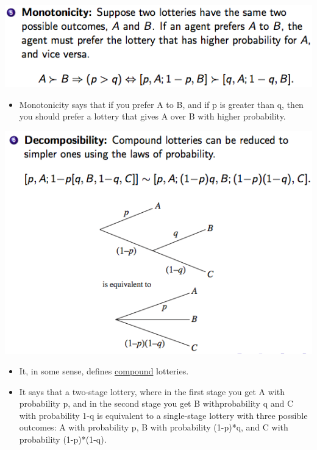 \documentclass[12pt]{article}
\begin{document}
\begin{tcolorbox}
\includegraphics[scale=0.5]{p5}\\

\begin{itemize}
\item Monotonicity says that if you prefer A to B, and if p is greater than q, then you should prefer a lottery that gives A over B with higher probability.
\end{itemize}

\includegraphics[scale=0.5]{p6}\\
\begin{itemize}
\item It, in some sense, defines \underline{compound} lotteries.
\item  It says that a two-stage lottery, where in the first
stage you get A with probability p, and in the second stage you get B
withprobability q and C with probability 1-q is equivalent to a single-stage
lottery with three possible outcomes: A with probability p, B with probability
(1-p)*q, and C with probability (1-p)*(1-q).
\end{itemize}
\end{tcolorbox}
\end{document}
